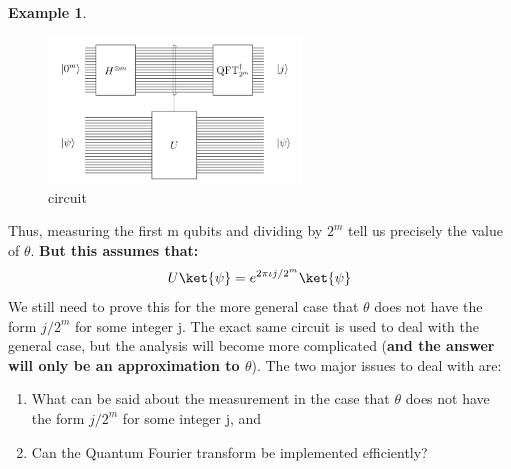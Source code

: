 \documentclass[12pt, oneside]{book}
\theoremstyle{definition}
\theoremstyle{definition}
\newtheorem{example}{Example}[section]
\theoremstyle{remark}
\begin{document}
\begin{example}
\begin{figure}[H]
        \centering
        \includegraphics[width=0.6\textwidth]{../images/phaseest3.png}
        \caption{circuit}
        \label{fig:phaseestimation3}
    \end{figure}
    Thus, measuring the first m qubits and dividing by $2^m$ tell us precisely the value of $\theta$.
    \textbf{But this assumes that:}
    \[
    U\ket{\psi}=e^{2\pi\iota j/2^m}\ket{\psi}
    \]
    We still need to prove this for the more general case that $\theta$ does not have the form $j/2^m$ for some integer j. 
    The exact same circuit is used to deal with the general case, but the analysis will become more complicated (\textbf{and the answer will only be an approximation to $\theta$}). The two major issues 
    to deal with are:
    \begin{enumerate}
        \item What can be said about the measurement in the case that $\theta$ does not have the form $j/2^m$ for some integer j, and
        \item Can the Quantum Fourier transform be implemented efficiently?
    \end{enumerate}
\end{example}
\end{document}
